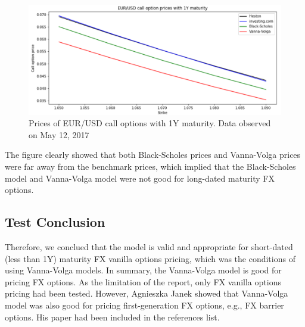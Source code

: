 \begin{figure}[htb]
	\centering
	\includegraphics[scale=0.4]{./Testing-data/Python-codes/Python-4prices-1Y.png} 
	\caption{Prices of EUR/USD call options with 1Y maturity. Data observed on May 12, 2017}
	\label{fig:prices-1Y-MAY12} %
\end{figure}
\noindent
The figure clearly showed that both Black-Scholes prices and Vanna-Volga prices were far away from the benchmark prices, which implied that the Black-Scholes model and Vanna-Volga model were not good for long-dated maturity FX options.

\subsection{Test Conclusion}
\noindent
Therefore, we conclued that the model is valid and appropriate for short-dated (less than 1Y) maturity FX vanilla options pricing, which was the conditions of using Vanna-Volga models. In summary, the Vanna-Volga model is good for pricing FX options. As the limitation of the report, only FX vanilla options pricing had been tested. However, Agnieszka Janek showed that Vanna-Volga model was also good for pricing first-generation FX options, e.g., FX barrier options. His paper had been included in the references list.

